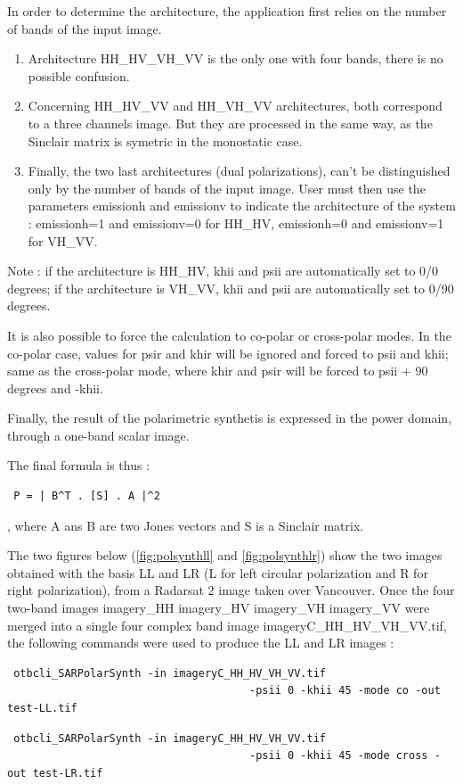In order to determine the architecture, the application first relies on the number of bands of the input image.
\begin{enumerate}
\item Architecture HH\_HV\_VH\_VV is the only one with four bands, there is no possible confusion.
\item Concerning HH\_HV\_VV and HH\_VH\_VV architectures, both correspond to a three channels image. But they are processed in the same way, as the Sinclair matrix is symetric in the monostatic case.
\item Finally, the two last architectures (dual polarizations), can't be distinguished only by the number of bands of the input image. User must then use the parameters emissionh and emissionv to indicate the architecture of the system : emissionh=1 and emissionv=0 for HH\_HV,  emissionh=0 and emissionv=1 for VH\_VV.
\end{enumerate}
Note : if the architecture is HH\_HV, khii and psii are automatically set to 0/0 degrees; if the architecture is VH\_VV, khii and psii are automatically set to 0/90 degrees.

It is also possible to force the calculation to co-polar or cross-polar modes.
In the co-polar case, values for psir and khir will be ignored and forced to psii and khii; same as the cross-polar mode, where khir and psir will be forced to psii + 90 degrees and -khii.

Finally, the result of the polarimetric synthetis is expressed in the power domain, through a one-band scalar image. \newline


 
The final formula is thus : \begin{verbatim} P = | B^T . [S] . A |^2 \end{verbatim} , where A ans B are two Jones vectors and S is a Sinclair matrix.
 
The two figures below (\ref{fig:polsynthll} and \ref{fig:polsynthlr}) show the two images obtained with the basis LL and LR (L for left circular polarization and R for right polarization),
from a Radarsat 2 image taken over Vancouver. Once the four two-band images imagery\_HH imagery\_HV imagery\_VH imagery\_VV were merged 
into a single four complex band image imageryC\_HH\_HV\_VH\_VV.tif, the following commands were used to produce the LL and LR images :

\begin{verbatim} otbcli_SARPolarSynth -in imageryC_HH_HV_VH_VV.tif 
									  -psii 0 -khii 45 -mode co -out test-LL.tif \end{verbatim}
\begin{verbatim} otbcli_SARPolarSynth -in imageryC_HH_HV_VH_VV.tif 
									  -psii 0 -khii 45 -mode cross -out test-LR.tif \end{verbatim}

